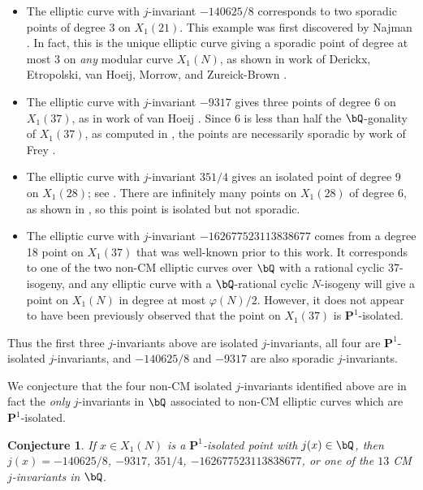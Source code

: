 \documentclass[11pt,reqno]{amsart}
\theoremstyle{plain}
\newtheorem{conjecture}[theorem]{Conjecture}
\theoremstyle{definition}
\newcommand{\Q}{\bQ}
\newcommand{\PP}{\mathbf P}
\begin{document}
\begin{itemize}
    \item The elliptic curve with $j$-invariant $-140625/8$ corresponds to two sporadic points of degree 3 on $X_1(21)$. This example was first discovered by Najman \cite{najman16}. In fact, this is the unique elliptic curve giving a sporadic point of degree at most 3 on \emph{any} modular curve $X_1(N)$, as shown in work of Derickx, Etropolski, van Hoeij, Morrow, and Zureick-Brown \cite{DEvHMZB2021}.

    \item The elliptic curve with $j$-invariant $-9317$ gives three points of degree 6 on $X_1(37)$, as in work of van Hoeij \cite{vanHoeij}. Since 6 is less than half the $\Q$-gonality of $X_1(37)$, as computed in \cite{DerickxVanHoeij2014}, the points are necessarily sporadic by work of Frey \cite{frey}.

    \item The elliptic curve with $j$-invariant $351/4$ gives an isolated point of degree 9 on $X_1(28)$; see \cite[Theorem 2]{OddDeg}. There are infinitely many points on $X_1(28)$ of degree 6, as shown in \cite{DerickxVanHoeij2014}, so this point is isolated but not sporadic.

    \item The elliptic curve with $j$-invariant $-162677523113838677$ comes from a degree 18 point on $X_1(37)$ that was well-known prior to this work. It corresponds to one of the two non-CM elliptic curves over $\Q$ with a rational cyclic 37-isogeny, and any elliptic curve with a $\Q$-rational cyclic $N$-isogeny will give a point on $X_1(N)$ in degree at most $\varphi(N)/2$. However, it does not appear to have been previously observed that the point on $X_1(37)$ is $\PP^1$-isolated.
\end{itemize}

Thus the first three $j$-invariants above are isolated $j$-invariants, all four are $\PP^1$-isolated $j$-invariants, and $-140625/8$  and $-9317$ are also sporadic $j$-invariants.

We conjecture that the four non-CM isolated $j$-invariants identified above are in fact the \emph{only} $j$-invariants in $\Q$ associated to non-CM elliptic curves which are $\PP^1$-isolated.

\begin{conjecture}\label{conj}
If $x\in X_1(N)$ is a $\PP^1$-isolated point with $j(x) \in \Q$, then $j(x)=-140625/8$, $-9317$, $351/4$, $-162677523113838677$, or one of the $13$ CM $j$-invariants in $\Q$.
\end{conjecture}
\end{document}
